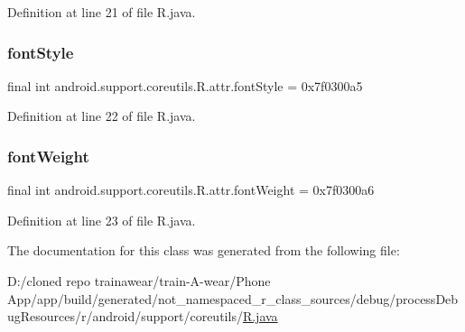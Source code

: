 Definition at line 21 of file R.\+java.

\mbox{\label{classandroid_1_1support_1_1coreutils_1_1_r_1_1attr_a9b35d3307670f8ef6f267a5b6d5bfc29}} 
\subsubsection{\texorpdfstring{fontStyle}{fontStyle}}
{\footnotesize\ttfamily final int android.\+support.\+coreutils.\+R.\+attr.\+font\+Style = 0x7f0300a5\hspace{0.3cm}{\ttfamily [static]}}



Definition at line 22 of file R.\+java.

\mbox{\label{classandroid_1_1support_1_1coreutils_1_1_r_1_1attr_a7c873eec8f29f4228759f62bbcd2969d}} 
\subsubsection{\texorpdfstring{fontWeight}{fontWeight}}
{\footnotesize\ttfamily final int android.\+support.\+coreutils.\+R.\+attr.\+font\+Weight = 0x7f0300a6\hspace{0.3cm}{\ttfamily [static]}}



Definition at line 23 of file R.\+java.



The documentation for this class was generated from the following file\+:\begin{DoxyCompactItemize}
\item 
D\+:/cloned repo trainawear/train-\/\+A-\/wear/\+Phone App/app/build/generated/not\+\_\+namespaced\+\_\+r\+\_\+class\+\_\+sources/debug/process\+Debug\+Resources/r/android/support/coreutils/\mbox{\hyperlink{process_debug_resources_2r_2android_2support_2coreutils_2_r_8java}{R.\+java}}\end{DoxyCompactItemize}
